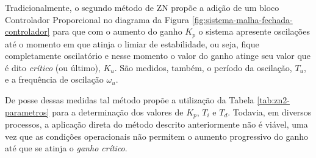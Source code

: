 			Tradicionalmente, o segundo método de \gls{ZN} propõe a adição de um bloco Controlador Proporcional no diagrama da Figura \ref{fig:sistema-malha-fechada-controlador} para que com o aumento do ganho $K_p$ o sistema apresente oscilações até o momento em que atinja o limiar de estabilidade, ou seja, fique completamente oscilatório e nesse momento o valor do ganho atinge seu valor que é dito \textit{crítico} (ou último), $K_u$. São medidos, também, o período da oscilação, $T_u$, e a frequência de oscilação $\omega_u$. 
			
			De posse dessas medidas tal método propõe a utilização da Tabela \ref{tab:zn2-parametros} para a determinação dos valores de $K_p$, $T_i$ e $T_d$. Todavia, em diversos processos, a aplicação direta do método descrito anteriormente não é viável, uma vez que as condições operacionais não permitem o aumento progressivo do ganho até que se atinja o \textit{ganho crítico}.

			\begin{table}[!htbp]	
				\centering
			\end{table}

			
			
